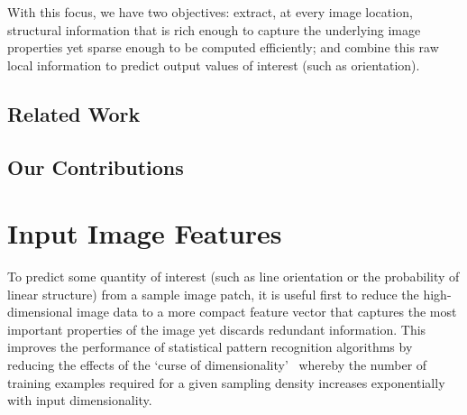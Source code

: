 \documentclass{IEEEtran}
\begin{document}
With this focus, we have two objectives: extract, at every image location, structural information that is rich enough to capture the underlying image properties yet sparse enough to be computed efficiently; and combine this raw local information to predict output values of interest (such as orientation).


\subsection{Related Work}


\subsection{Our Contributions}





\clearpage
\section{Input Image Features}
\label{s:filtering}
To predict some quantity of interest (such as line orientation or the probability of linear structure) from a sample image patch, it is useful first to reduce the high-dimensional image data to a more compact feature vector that captures the most important properties of the image yet discards redundant information. This improves the performance of statistical pattern recognition algorithms by reducing the effects of the `curse of dimensionality'~\cite{Bellman} whereby the number of training examples required for a given sampling density increases exponentially with input dimensionality.


\end{document}
